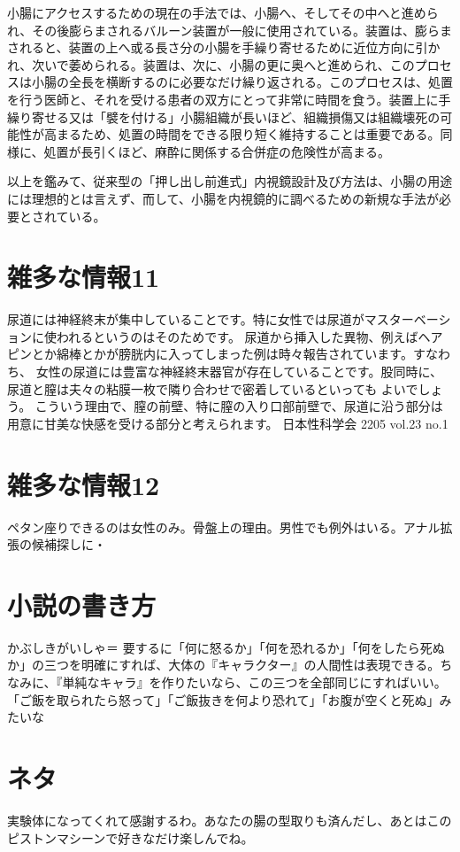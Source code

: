 小腸にアクセスするための現在の手法では、小腸へ、そしてその中へと進められ、その後膨らまされるバルーン装置が一般に使用されている。装置は、膨らまされると、装置の上へ或る長さ分の小腸を手繰り寄せるために近位方向に引かれ、次いで萎められる。装置は、次に、小腸の更に奥へと進められ、このプロセスは小腸の全長を横断するのに必要なだけ繰り返される。このプロセスは、処置を行う医師と、それを受ける患者の双方にとって非常に時間を食う。装置上に手繰り寄せる又は「襞を付ける」小腸組織が長いほど、組織損傷又は組織壊死の可能性が高まるため、処置の時間をできる限り短く維持することは重要である。同様に、処置が長引くほど、麻酔に関係する合併症の危険性が高まる。

以上を鑑みて、従来型の「押し出し前進式」内視鏡設計及び方法は、小腸の用途には理想的とは言えず、而して、小腸を内視鏡的に調べるための新規な手法が必要とされている。

\section{雑多な情報11}
尿道には神経終末が集中していることです。特に女性では尿道がマスターベーションに使われるというのはそのためです。
尿道から挿入した異物、例えばヘアピンとか綿棒とかが膀胱内に入ってしまった例は時々報告されています。すなわち、
女性の尿道には豊富な神経終末器官が存在していることです。股同時に、尿道と膣は夫々の粘膜一枚で隣り合わせで密着しているといっても
よいでしょう。
こういう理由で、膣の前壁、特に膣の入り口部前壁で、尿道に沿う部分は用意に甘美な快感を受ける部分と考えられます。
日本性科学会 2205 vol.23 no.1

\section{雑多な情報12}
ペタン座りできるのは女性のみ。骨盤上の理由。男性でも例外はいる。アナル拡張の候補探しに・

\section{小説の書き方}
かぶしきがいしゃ＝
要するに「何に怒るか」「何を恐れるか」「何をしたら死ぬか」の三つを明確にすれば、大体の『キャラクター』の人間性は表現できる。ちなみに、『単純なキャラ』を作りたいなら、この三つを全部同じにすればいい。「ご飯を取られたら怒って」「ご飯抜きを何より恐れて」「お腹が空くと死ぬ」みたいな



\section{ネタ}
実験体になってくれて感謝するわ。あなたの腸の型取りも済んだし、あとはこのピストンマシーンで好きなだけ楽しんでね。

